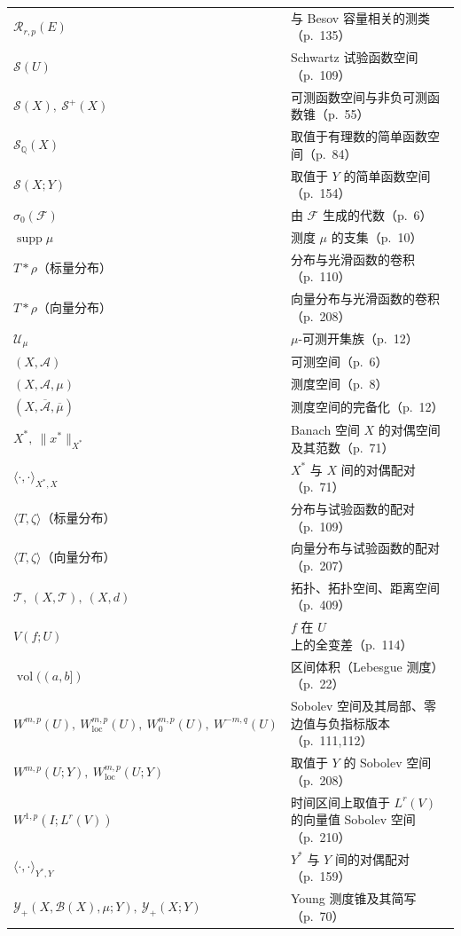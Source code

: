 \documentclass[../main.tex]{subfiles}
\begin{document}
\begin{longtable}{p{}p{}}
$\mathscr{R}_{r,p}(E)$ & 与 Besov 容量相关的测类（p.~135）\\
$\mathcal{S}(U)$ & Schwartz 试验函数空间（p.~109）\\
$\mathcal{S}(X),\ \mathcal{S}^+(X)$ & 可测函数空间与非负可测函数锥（p.~55）\\
$\mathcal{S}_\mathbb{Q}(X)$ & 取值于有理数的简单函数空间（p.~84）\\
$\mathcal{S}(X;Y)$ & 取值于 $Y$ 的简单函数空间（p.~154）\\
$\sigma_0(\mathcal{F})$ & 由 $\mathcal{F}$ 生成的代数（p.~6）\\
$\operatorname{supp}\mu$ & 测度 $\mu$ 的支集（p.~10）\\
$T*\rho$（标量分布） & 分布与光滑函数的卷积（p.~110）\\
$T*\rho$（向量分布） & 向量分布与光滑函数的卷积（p.~208）\\
$\mathcal{U}_\mu$ & $\mu$-可测开集族（p.~12）\\
$(X,\mathcal{A})$ & 可测空间（p.~6）\\
$(X,\mathcal{A},\mu)$ & 测度空间（p.~8）\\
$(X,\overline{\mathcal{A}},\overline{\mu})$ & 测度空间的完备化（p.~12）\\
$X^*,\ \|x^*\|_{X^*}$ & Banach 空间 $X$ 的对偶空间及其范数（p.~71）\\
$\langle\cdot,\cdot\rangle_{X^*,X}$ & $X^*$ 与 $X$ 间的对偶配对（p.~71）\\
$\langle T,\zeta\rangle$（标量分布） & 分布与试验函数的配对（p.~109）\\
$\langle T,\zeta\rangle$（向量分布） & 向量分布与试验函数的配对（p.~207）\\
$\mathcal{T},\ (X,\mathcal{T}),\ (X,d)$ & 拓扑、拓扑空间、距离空间（p.~409）\\
$V(f;U)$ & $f$ 在 $U$ 上的全变差（p.~114）\\
$\operatorname{vol}((a,b])$ & 区间体积（Lebesgue 测度）（p.~22）\\
$W^{m,p}(U),\ W^{m,p}_{\mathrm{loc}}(U),\ W^{m,p}_0(U),\ W^{-m,q}(U)$ & Sobolev 空间及其局部、零边值与负指标版本（p.~111,112）\\
$W^{m,p}(U;Y),\ W^{m,p}_{\mathrm{loc}}(U;Y)$ & 取值于 $Y$ 的 Sobolev 空间（p.~208）\\
$W^{1,p}(I;L^r(V))$ & 时间区间上取值于 $L^r(V)$ 的向量值 Sobolev 空间（p.~210）\\
$\langle\cdot,\cdot\rangle_{Y^*,Y}$ & $Y^*$ 与 $Y$ 间的对偶配对（p.~159）\\
$\mathcal{Y}_+(X,\mathcal{B}(X),\mu;Y),\ \mathcal{Y}_+(X;Y)$ & Young 测度锥及其简写（p.~70）\\
\hline
\end{longtable}
\end{document}
